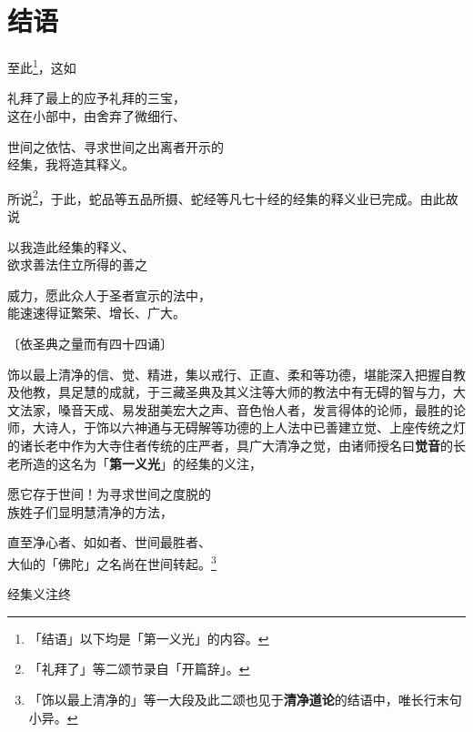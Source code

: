 \chapter{结语}

至此\footnote{「结语」以下均是「第一义光」的内容。}，这如

\begin{quoting}
礼拜了最上的应予礼拜的三宝，\\
这在小部中，由舍弃了微细行、

世间之依怙、寻求世间之出离者开示的\\
经集，我将造其释义。
\end{quoting}

所说\footnote{「礼拜了」等二颂节录自「开篇辞」。}，于此，蛇品等五品所摄、蛇经等凡七十经的经集的释义业已完成。由此故说

\begin{quoting}
以我造此经集的释义、\\
欲求善法住立所得的善之

威力，愿此众人于圣者宣示的法中，\\
能速速得证繁荣、增长、广大。
\end{quoting}

\begin{center}\vspace{1em}〔依圣典之量而有四十四诵〕\end{center}

饰以最上清净的信、觉、精进，集以戒行、正直、柔和等功德，堪能深入把握自教及他教，具足慧的成就，于三藏圣典及其义注等大师的教法中有无碍的智与力，大文法家，嗓音天成、易发甜美宏大之声、音色怡人者，发言得体的论师，最胜的论师，大诗人，于饰以六神通与无碍解等功德的上人法中已善建立觉、上座传统之灯的诸长老中作为大寺住者传统的庄严者，具广大清净之觉，由诸师授名曰\textbf{觉音}的长老所造的这名为「\textbf{第一义光}」的经集的义注，

\begin{quoting}愿它存于世间！为寻求世间之度脱的\\
族姓子们显明慧清净的方法，

直至净心者、如如者、世间最胜者、\\
大仙的「佛陀」之名尚在世间转起。\footnote{「饰以最上清净的」等一大段及此二颂也见于\textbf{清净道论}的结语中，唯长行末句小异。}\end{quoting}

\begin{center}\vspace{1em}经集义注终\end{center}